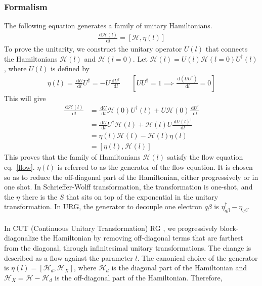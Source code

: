 \documentclass[twoside]{report}
\numberwithin{equation}{section}
\begin{document}
\subsubsection{Formalism}
The following equation generates a family of unitary Hamiltonians.
\begin{equation}\begin{aligned}
	\label{flow}
	\frac{\:\mathrm{d}\mathcal{H}(l)}{\:\mathrm{d}l} = \left[\mathcal{H},\eta(l)\right]
\end{aligned}\end{equation}
To prove the unitarity\cite{kehrein}, we construct the unitary operator \(U(l)\) that connects the Hamiltonians \(\mathcal{H}(l)\) and \(\mathcal{H}(l=0)\). Let \(\mathcal{H}(l) = U(l)\mathcal{H}(l=0)U^\dagger(l)\), where \(U(l)\) is defined by
\begin{equation}\begin{aligned}
	\eta(l) = \frac{\:\mathrm{d}U}{\:\mathrm{d}l}U^\dagger = -U\frac{\:\mathrm{d}U^\dagger}{\:\mathrm{d}l} &&\left[UU^\dagger = 1 \implies \frac{\:\mathrm{d}\left(U U^\dagger\right)}{\:\mathrm{d}l}=0\right]
\end{aligned}\end{equation}
This will give
\begin{equation}\begin{aligned}
	\frac{\:\mathrm{d}\mathcal{H}(l)}{\:\mathrm{d}l} &= \frac{\:\mathrm{d}U}{\:\mathrm{d}l}\mathcal{H}(0)U^\dagger(l) + U\mathcal{H}(0)\frac{\:\mathrm{d}U^\dagger}{\:\mathrm{d}l}\\
							 &= \frac{\:\mathrm{d}U}{\:\mathrm{d}l}U^\dagger\mathcal{H}(l) + \mathcal{H}(l)U\frac{\:\mathrm{d}U(l)^\dagger}{\:\mathrm{d}l}\\
        &= \eta(l)\mathcal{H}(l) - \mathcal{H}(l)\eta(l)\\
	&=\left[\eta(l),\mathcal{H}(l)\right]
\end{aligned}\end{equation}
This proves that the family of Hamiltonians \(\mathcal{H}(l)\) satisfy the flow equation eq.~\ref{flow}. \(\eta(l)\) is referred to as the generator of the flow equation. It is chosen so as to reduce the off-diagonal part of the Hamiltonian, either progressively or in one shot. In Schrieffer-Wolff transformation, the transformation is one-shot, and the \(\eta\) there is the \(S\) that sits on top of the exponential in the unitary transformation. In URG, the generator to decouple one electron \(q\beta\) is \(\eta^\dagger_{q\beta} - \eta_{q\beta}\).
\\\\In CUT (Continuous Unitary Transformation) RG \cite{glazek-wilson}, we progressively block-diagonalize the Hamiltonian by removing off-diagonal terms that are farthest from the diagonal, through infinitesimal unitary transformations. The change is described as a flow against the parameter \(l\). The canonical choice of the generator is \(\eta(l) = \left[\mathcal{H}_d,\mathcal{H}_X\right]\), where \(\mathcal{H}_d\) is the diagonal part of the Hamiltonian and \(\mathcal{H}_X = \mathcal{H} - \mathcal{H}_d\) is the off-diagonal part of the Hamiltonian. Therefore,
\end{document}
